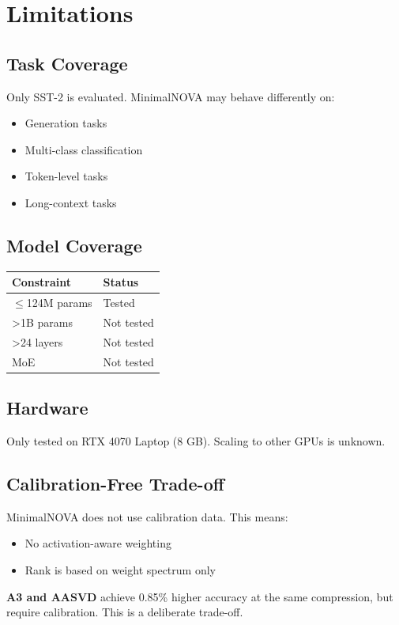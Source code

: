 
\section{Limitations}

\subsection{Task Coverage}

Only SST-2 is evaluated. MinimalNOVA may behave differently on:
\begin{itemize}
\item Generation tasks
\item Multi-class classification
\item Token-level tasks
\item Long-context tasks

\end{itemize}
\subsection{Model Coverage}

\begin{table}[H]
\centering
\small
\begin{tabular}{ll}
\toprule
\textbf{Constraint} & \textbf{Status} \\
\midrule
$\le$124M params & Tested \\
>1B params & Not tested \\
>24 layers & Not tested \\
MoE & Not tested \\
\bottomrule
\end{tabular}
\end{table}

\subsection{Hardware}

Only tested on RTX 4070 Laptop (8 GB). Scaling to other GPUs is unknown.

\subsection{Calibration-Free Trade-off}

MinimalNOVA does not use calibration data. This means:
\begin{itemize}
\item No activation-aware weighting
\item Rank is based on weight spectrum only

\end{itemize}
\textbf{A3 and AASVD} achieve 0.85\% higher accuracy at the same 
compression, but require calibration. This is a deliberate trade-off.

